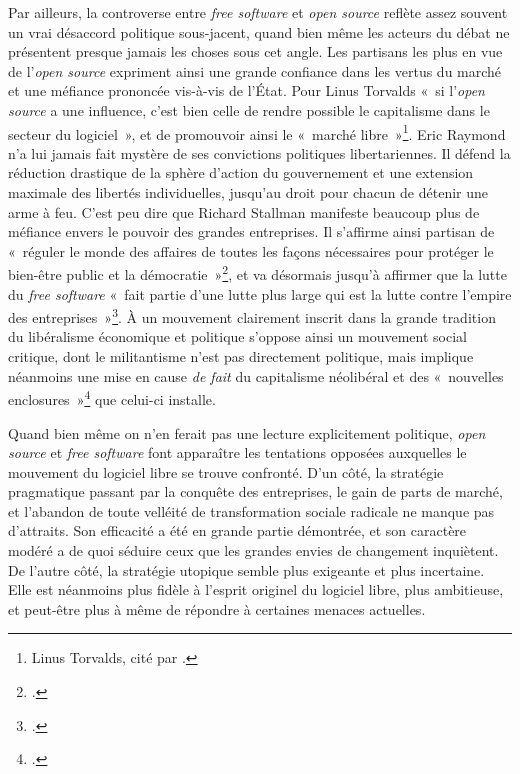 \documentclass{FramateX}
\begin{document}
\begin{refsection}
Par ailleurs, la controverse entre \textit{free software} et
\textit{open source} reflète assez souvent un vrai désaccord politique
sous-jacent, quand bien même les acteurs du débat ne présentent presque
jamais les choses sous cet angle. Les partisans les plus en vue de
l'\textit{open source} expriment ainsi une grande confiance dans les
vertus du marché et une méfiance prononcée vis-à-vis de l'État. Pour
Linus Torvalds «~si l'\textit{open source} a une influence, c'est bien
celle de rendre possible le capitalisme dans le secteur du logiciel~»,
et de promouvoir ainsi le «~marché libre~»\footnote{Linus Torvalds,
cité par \cite[p.~109]{tapscottwikinomics.2006}.}. Eric Raymond n'a lui jamais fait
mystère de ses convictions politiques libertariennes. Il défend la
réduction drastique de la sphère d'action du gouvernement et une
extension maximale des libertés individuelles, jusqu'au droit pour
chacun de détenir une arme à feu. C'est peu dire que
Richard Stallman manifeste beaucoup plus de méfiance envers le pouvoir
des grandes entreprises. Il s'affirme ainsi partisan de «~réguler le
monde des affaires de toutes les façons nécessaires pour protéger le
bien-être public et la démocratie~»\footnote{\cite{stallmanrms2010}.}, et va
désormais jusqu'à affirmer que la lutte du
\textit{free software} «~fait partie d'une lutte plus
large qui est la lutte contre l'empire des
entreprises~»\footnote{\cite{stallmanavec2011}.}.
À un mouvement clairement inscrit dans la grande tradition du
libéralisme économique et politique s'oppose ainsi un
mouvement social critique, dont le militantisme n'est
pas directement politique, mais implique néanmoins une mise en cause
\textit{de fait} du capitalisme néolibéral et des «~nouvelles
enclosures~»\footnote{\cite{boylesecond2003}.} que celui-ci installe. 

Quand bien même on n'en ferait pas une lecture
explicitement politique, \textit{open source} et \textit{free software} font apparaître les tentations opposées auxquelles le mouvement du
logiciel libre se trouve confronté. D'un côté, la
stratégie pragmatique passant par la conquête des entreprises, le gain
de parts de marché, et l'abandon de toute velléité de
transformation sociale radicale ne manque pas
d'attraits. Son efficacité a été en grande partie
démontrée, et son caractère modéré a de quoi séduire ceux que les
grandes envies de changement inquiètent. De l'autre
côté, la stratégie utopique semble plus exigeante et plus incertaine.
Elle est néanmoins plus fidèle à l'esprit originel du
logiciel libre, plus ambitieuse, et peut-être plus à même de répondre à
certaines menaces actuelles. 


\end{refsection}
\end{document}
